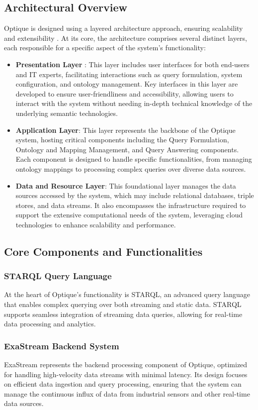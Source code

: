 \subsection{Architectural Overview}
Optique is designed using a layered architecture approach, ensuring scalability and extensibility \cite{DBLP:conf/esws/KharlamovJZBGHHKKORRSSSW13}. At its core, the architecture comprises several distinct layers, each responsible for a specific aspect of the system's functionality:
\begin{itemize}
\item \textbf{Presentation Layer} : This layer includes user interfaces for both end-users and \ac{IT} experts, facilitating interactions such as query formulation, system configuration, and ontology management. Key interfaces in this layer are developed to ensure user-friendliness and accessibility, allowing users to interact with the system without needing in-depth technical knowledge of the underlying semantic technologies.
\item \textbf{Application Layer}: This layer represents the backbone of the Optique system, hosting critical components including the Query Formulation, Ontology and Mapping Management, and Query Answering components. Each component is designed to handle specific functionalities, from managing ontology mappings to processing complex queries over diverse data sources.
\item \textbf{Data and Resource Layer}: This foundational layer manages the data sources accessed by the system, which may include relational databases, triple stores, and data streams. It also encompasses the infrastructure required to support the extensive computational needs of the system, leveraging cloud technologies to enhance scalability and performance. 
\end{itemize}
\subsection{Core Components and Functionalities}
\subsubsection{STARQL Query Language}
At the heart of Optique's functionality is \ac{STARQL}, an advanced query language that enables complex querying over both streaming and static data. \ac{STARQL} supports seamless integration of streaming data queries, allowing for real-time data processing and analytics.
\subsubsection{ExaStream Backend System}
ExaStream represents the backend processing component of Optique, optimized for handling high-velocity data streams with minimal latency. Its design focuses on efficient data ingestion and query processing, ensuring that the system can manage the continuous influx of data from industrial sensors and other real-time data sources.
